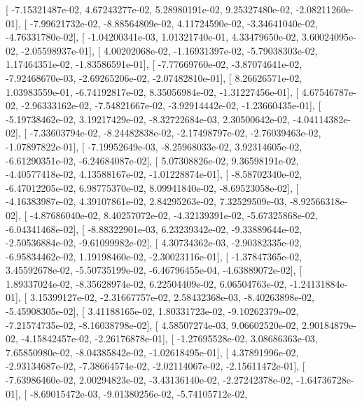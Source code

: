 \documentclass{article}
\begin{document}
       [ -7.15321487e-02,   4.67243277e-02,   5.28980191e-02,
          9.25327480e-02,  -2.08211260e-01],
       [ -7.99621732e-02,  -8.88564809e-02,   4.11724590e-02,
         -3.34641040e-02,  -4.76331780e-02],
       [ -1.04200341e-03,   1.01321740e-01,   4.33479650e-02,
          3.60024095e-02,  -2.05598937e-01],
       [  4.00202068e-02,  -1.16931397e-02,  -5.79038303e-02,
          1.17464351e-02,  -1.83586591e-01],
       [ -7.77669760e-02,  -3.87074641e-02,  -7.92468670e-03,
         -2.69265206e-02,  -2.07482810e-01],
       [  8.26626571e-02,   1.03983559e-01,  -6.74192817e-02,
          8.35056984e-02,  -1.31227456e-01],
       [  4.67546787e-02,  -2.96333162e-02,  -7.54821667e-02,
         -3.92914442e-02,  -1.23660435e-01],
       [ -5.19738462e-02,   3.19217429e-02,  -8.32722684e-03,
          2.30500642e-02,  -4.04114382e-02],
       [ -7.33603794e-02,  -8.24482838e-02,  -2.17498797e-02,
         -2.76039463e-02,  -1.07897822e-01],
       [ -7.19952649e-03,  -8.25968033e-02,   3.92314605e-02,
         -6.61290351e-02,  -6.24684087e-02],
       [  5.07308826e-02,   9.36598191e-02,  -4.40577418e-02,
          4.13588167e-02,  -1.01228874e-01],
       [ -8.58702340e-02,  -6.47012205e-02,   6.98775370e-02,
          8.09941840e-02,  -8.69523058e-02],
       [ -4.16383987e-02,   4.39107861e-02,   2.84295263e-02,
          7.32529509e-03,  -8.92566318e-02],
       [ -4.87686040e-02,   8.40257072e-02,  -4.32139391e-02,
         -5.67325868e-02,  -6.04341468e-02],
       [ -8.88322901e-03,   6.23239342e-02,  -9.33889644e-02,
         -2.50536884e-02,  -9.61099982e-02],
       [  4.30734362e-03,  -2.90382335e-02,  -6.95834462e-02,
          1.19198460e-02,  -2.30023116e-01],
       [ -1.37847365e-02,   3.45592678e-02,  -5.50735199e-02,
         -6.46796455e-04,  -4.63889072e-02],
       [  1.89337024e-02,  -8.35628974e-02,   6.22504409e-02,
          6.06504763e-02,  -1.24131884e-01],
       [  3.15399127e-02,  -2.31667757e-02,   2.58432368e-03,
         -8.40263898e-02,  -5.45908305e-02],
       [  3.41188165e-02,   1.80331723e-02,  -9.10262379e-02,
         -7.21574735e-02,  -8.16038798e-02],
       [  4.58507274e-03,   9.06602520e-02,   2.90184879e-02,
         -4.15842457e-02,  -2.26176878e-01],
       [ -1.27695528e-02,   3.08686363e-03,   7.65850980e-02,
         -8.04385842e-02,  -1.02618495e-01],
       [  4.37891996e-02,  -2.93134687e-02,  -7.38664574e-02,
         -2.02114067e-02,  -2.15611472e-01],
       [ -7.63986460e-02,   2.00294823e-02,  -3.43136140e-02,
         -2.27242378e-02,  -1.64736728e-01],
       [ -8.69015472e-03,  -9.01380256e-02,  -5.74105712e-02,
\end{document}
